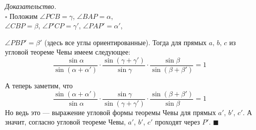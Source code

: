 \documentclass[14pt]{extarticle}
\theoremstyle{definition}
\theoremstyle{theorem}
\renewenvironment{proof}
    {\noindent \textit{Доказательство.}\\
	\indent $\square$}
	{ $\blacksquare$\\ }
\begin{document}

\begin{proof}
Положим \(\angle PCB = \gamma\), \( \angle BAP = \alpha\), \\
\(\angle CBP = \beta\), \(\angle P'CP = \gamma'\), \(\angle PAP' = \alpha'\), \par
\begin{figure}
    \vspace{-2cm}
\end{figure}
\noindent\(\angle PBP' = \beta'\) (здесь все углы
ориентированные). Тогда для прямых  \(a, \, b, \, c\) из угловой теореме
Чевы имеем следующее:
\[
\frac{\sin \alpha}{\sin(\alpha + \alpha ')} \cdot
\frac{\sin(\gamma + \gamma ')}{\sin \gamma} \cdot
\frac{\sin \beta}{\sin(\beta + \beta ')} 
 = 1
\]

\noindent А теперь заметим, что 
\[
\frac{\sin(\alpha + \alpha ')}{\sin \alpha} \cdot
\frac{\sin \gamma}{\sin(\gamma + \gamma ')} \cdot
\frac{\sin(\beta + \beta ')}{\sin \beta} 
 = 1
\]
Но ведь это --- выражение угловой формы теоремы Чевы для прямых
\(a'\), \(b'\), \(c'\). А значит, согласно угловой теореме Чевы, 
\(a'\), \(b'\), \(c'\) проходят через \(P'\).
\end{proof} \vspace{-4mm} 
\end{document}
